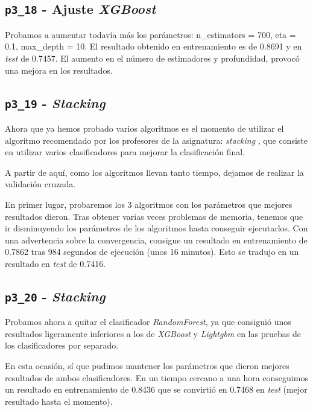 \documentclass[a4paper, 20pt]{article}
\begin{document}
\subsection{\texttt{p3\_18} - Ajuste \textit{XGBoost}}

Probamos a aumentar todavía más los parámetros: {\ttfamily n\_estimators = 700, eta = 0.1, max\_depth = 10}. El resultado obtenido en entrenamiento es de 0.8691 y en \textit{test} de 0.7457. El aumento en el número de estimadores y profundidad, provocó una mejora en los resultados.


\subsection{\texttt{p3\_19} - \textit{Stacking}}

Ahora que ya hemos probado varios algoritmos es el momento de utilizar el algoritmo recomendado por los profesores de la asignatura: \textit{stacking} \cite{noauthor_sklearn.ensemble.stackingclassifier_nodate}, que consiste en utilizar varios clasificadores para mejorar la clasificación final.

A partir de aquí, como los algoritmos llevan tanto tiempo, dejamos de realizar la validación cruzada.

En primer lugar, probaremos los 3 algoritmos con los parámetros que mejores resultados dieron. Tras obtener varias veces problemas de memoria, tenemos que ir disminuyendo los parámetros de los algoritmos hasta conseguir ejecutarlos. Con una advertencia sobre la convergencia, consigue un resultado en entrenamiento de 0.7862 tras 984 segundos de ejecución (unos 16 minutos). Esto se tradujo en un resultado en \textit{test} de 0.7416.
  
\subsection{\texttt{p3\_20} - \textit{Stacking}}\label{sec:20}

Probamos ahora a quitar el clasificador \textit{RandomForest}, ya que consiguió unos resultados ligeramente inferiores a los de \textit{XGBoost} y \textit{Lightgbm} en las pruebas de los clasificadores por separado.

En esta ocasión, sí que pudimos mantener los parámetros que dieron mejores resultados de ambos clasificadores. En un tiempo cercano a una hora conseguimos un resultado en entrenamiento de 0.8436 que se convirtió en 0.7468 en \textit{test} (mejor resultado hasta el momento).
\end{document}
